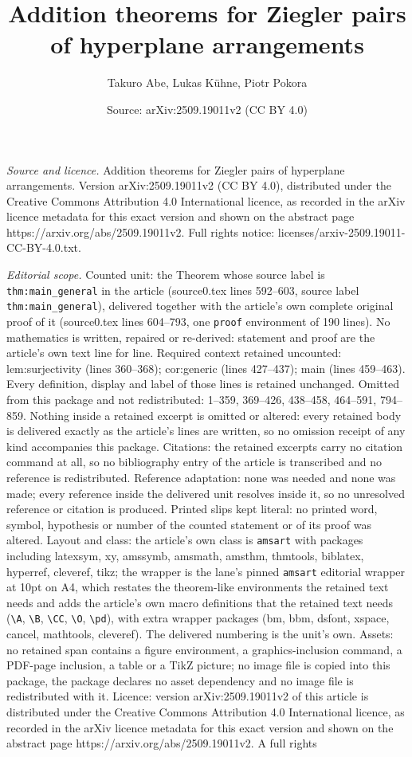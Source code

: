 \documentclass[10pt,a4paper]{amsart}
\title[Addition theorems for Ziegler pairs of hyperplane arrangemen]{Addition theorems for Ziegler pairs of hyperplane arrangements}
\author{Takuro Abe, Lukas K\"uhne, Piotr Pokora}
\date{Source: arXiv:2509.19011v2 (CC BY 4.0)}
\begin{document}
\maketitle

\noindent\emph{Source and licence.} Addition theorems for Ziegler pairs of hyperplane arrangements. Version arXiv:2509.19011v2 (CC BY 4.0), distributed under the Creative Commons Attribution 4.0 International licence, as recorded in the arXiv licence metadata for this exact version and shown on the abstract page https://arxiv.org/abs/2509.19011v2. Full rights notice: licenses/arxiv-2509.19011-CC-BY-4.0.txt.\par\smallskip

\noindent\textit{Editorial scope.} Counted unit: the Theorem whose source label is \texttt{thm:main\_general} in the article (source0.tex lines 592--603, source label \texttt{thm:main\_general}), delivered together with the article's own complete original proof of it (source0.tex lines 604--793, one \texttt{proof} environment of 190 lines). No mathematics is written, repaired or re-derived: statement and proof are the article's own text line for line. Required context retained uncounted: lem:surjectivity (lines 360--368); cor:generic (lines 427--437); main (lines 459--463). Every definition, display and label of those lines is retained unchanged. Omitted from this package and not redistributed: 1--359, 369--426, 438--458, 464--591, 794--859. Nothing inside a retained excerpt is omitted or altered: every retained body is delivered exactly as the article's lines are written, so no omission receipt of any kind accompanies this package. Citations: the retained excerpts carry no citation command at all, so no bibliography entry of the article is transcribed and no reference is redistributed. Reference adaptation: none was needed and none was made; every reference inside the delivered unit resolves inside it, so no unresolved reference or citation is produced. Printed slips kept literal: no printed word, symbol, hypothesis or number of the counted statement or of its proof was altered. Layout and class: the article's own class is \texttt{amsart} with packages including latexsym, xy, amssymb, amsmath, amsthm, thmtools, biblatex, hyperref, cleveref, tikz; the wrapper is the lane's pinned \texttt{amsart} editorial wrapper at 10pt on A4, which restates the theorem-like environments the retained text needs and adds the article's own macro definitions that the retained text needs (\texttt{\textbackslash A}, \texttt{\textbackslash B}, \texttt{\textbackslash CC}, \texttt{\textbackslash O}, \texttt{\textbackslash pd}), with extra wrapper packages (bm, bbm, dsfont, xspace, cancel, mathtools, cleveref). The delivered numbering is the unit's own. Assets: no retained span contains a figure environment, a graphics-inclusion command, a PDF-page inclusion, a table or a TikZ picture; no image file is copied into this package, the package declares no asset dependency and no image file is redistributed with it. Licence: version arXiv:2509.19011v2 of this article is distributed under the Creative Commons Attribution 4.0 International licence, as recorded in the arXiv licence metadata for this exact version and shown on the abstract page https://arxiv.org/abs/2509.19011v2. A full rights 
\end{document}
